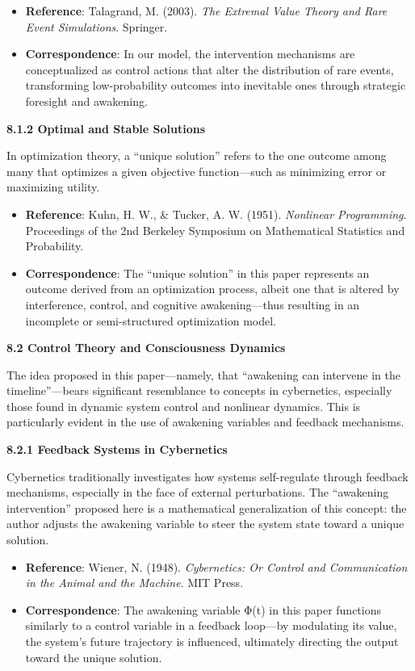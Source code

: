 \documentclass[
]{article}
\begin{document}
\begin{itemize}
\item
  \textbf{Reference}: Talagrand, M. (2003). \emph{The Extremal Value
  Theory and Rare Event Simulations}. Springer.
\item
  \textbf{Correspondence}: In our model, the intervention mechanisms are
  conceptualized as control actions that alter the distribution of rare
  events, transforming low-probability outcomes into inevitable ones
  through strategic foresight and awakening.
\end{itemize}

\textbf{8.1.2 Optimal and Stable Solutions}

In optimization theory, a ``unique solution'' refers to the one outcome
among many that optimizes a given objective function---such as
minimizing error or maximizing utility.

\begin{itemize}
\item
  \textbf{Reference}: Kuhn, H. W., \& Tucker, A. W. (1951).
  \emph{Nonlinear Programming}. Proceedings of the 2nd Berkeley
  Symposium on Mathematical Statistics and Probability.
\item
  \textbf{Correspondence}: The ``unique solution'' in this paper
  represents an outcome derived from an optimization process, albeit one
  that is altered by interference, control, and cognitive
  awakening---thus resulting in an incomplete or semi-structured
  optimization model.
\end{itemize}

\textbf{8.2 Control Theory and Consciousness Dynamics}

The idea proposed in this paper---namely, that ``awakening can intervene
in the timeline''---bears significant resemblance to concepts in
cybernetics, especially those found in dynamic system control and
nonlinear dynamics. This is particularly evident in the use of awakening
variables and feedback mechanisms.

\textbf{8.2.1 Feedback Systems in Cybernetics}

Cybernetics traditionally investigates how systems self-regulate through
feedback mechanisms, especially in the face of external perturbations.
The ``awakening intervention'' proposed here is a mathematical
generalization of this concept: the author adjusts the awakening
variable to steer the system state toward a unique solution.

\begin{itemize}
\item
  \textbf{Reference}: Wiener, N. (1948). \emph{Cybernetics: Or Control
  and Communication in the Animal and the Machine}. MIT Press.
\item
  \textbf{Correspondence}: The awakening variable Φ(t) in this paper
  functions similarly to a control variable in a feedback loop---by
  modulating its value, the system's future trajectory is influenced,
  ultimately directing the output toward the unique solution.
\end{itemize}
\end{document}
